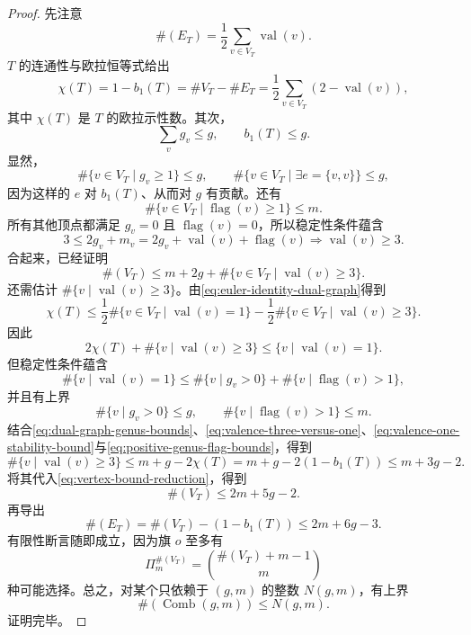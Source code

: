 \begin{proof}
先注意
\[
 \#(E_T)=\frac12\sum_{v\in V_T}\operatorname{val}(v).
\]
$T$ 的连通性与欧拉恒等式给出
\begin{equation}
 \chi(T)=1-b_1(T)=\#V_T-\#E_T
 =\frac12\sum_{v\in V_T}(2-\operatorname{val}(v)),
 \label{eq:euler-identity-dual-graph}
\end{equation}
其中 $\chi(T)$ 是 $T$ 的欧拉示性数。其次，
\begin{equation}
 \sum_vg_v\leq g,
 \qquad b_1(T)\leq g.
 \label{eq:dual-graph-genus-bounds}
\end{equation}
显然，
\[
 \#\{v\in V_T\mid g_v\geq1\}\leq g,
 \qquad
 \#\{v\in V_T\mid\exists e=\{v,v\}\}\leq g,
\]
因为这样的 $e$ 对 $b_1(T)$、从而对 $g$ 有贡献。还有
\[
 \#\{v\in V_T\mid\operatorname{flag}(v)\geq1\}\leq m.
\]
所有其他顶点都满足 $g_v=0$ 且 $\operatorname{flag}(v)=0$，所以稳定性条件蕴含
\[
 3\leq2g_v+m_v
 =2g_v+\operatorname{val}(v)+\operatorname{flag}(v)
 \Longrightarrow\operatorname{val}(v)\geq3.
\]
合起来，已经证明
\begin{equation}
 \#(V_T)\leq m+2g
 +\#\{v\in V_T\mid\operatorname{val}(v)\geq3\}.
 \label{eq:vertex-bound-reduction}
\end{equation}
还需估计 $\#\{v\mid\operatorname{val}(v)\geq3\}$。由\eqref{eq:euler-identity-dual-graph}得到
\[
 \chi(T)\leq\frac12\#\{v\in V_T\mid\operatorname{val}(v)=1\}
 -\frac12\#\{v\in V_T\mid\operatorname{val}(v)\geq3\}.
\]
因此
\begin{equation}
 2\chi(T)+\#\{v\mid\operatorname{val}(v)\geq3\}
 \leq\{v\mid\operatorname{val}(v)=1\}.
 \label{eq:valence-three-versus-one}
\end{equation}
但稳定性条件蕴含
\begin{equation}
 \#\{v\mid\operatorname{val}(v)=1\}
 \leq\#\{v\mid g_v>0\}
 +\#\{v\mid\operatorname{flag}(v)>1\},
 \label{eq:valence-one-stability-bound}
\end{equation}
并且有上界
\begin{equation}
 \#\{v\mid g_v>0\}\leq g,
 \qquad\#\{v\mid\operatorname{flag}(v)>1\}\leq m.
 \label{eq:positive-genus-flag-bounds}
\end{equation}
结合\eqref{eq:dual-graph-genus-bounds}、\eqref{eq:valence-three-versus-one}、\eqref{eq:valence-one-stability-bound}与\eqref{eq:positive-genus-flag-bounds}，得到
\[
 \#\{v\mid\operatorname{val}(v)\geq3\}
 \leq m+g-2\chi(T)
 =m+g-2(1-b_1(T))\leq m+3g-2.
\]
将其代入\eqref{eq:vertex-bound-reduction}，得到
\[
 \#(V_T)\leq2m+5g-2.
\]
再导出
\[
 \#(E_T)=\#(V_T)-(1-b_1(T))\leq2m+6g-3.
\]
有限性断言随即成立，因为旗 $o$ 至多有
\[
 \Pi_m^{\#(V_T)}
 =\binom{\#(V_T)+m-1}{m}
\]
种可能选择。总之，对某个只依赖于 $(g,m)$ 的整数 $N(g,m)$，有上界
\[
 \#(\operatorname{Comb}(g,m))\leq N(g,m).
\]
证明完毕。
\end{proof}

